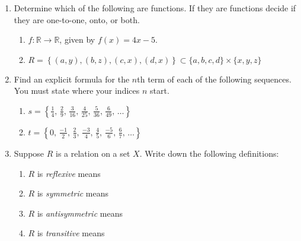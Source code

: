 \documentclass[12pt,letterpaper]{article}
\begin{document}
\begin{enumerate}

\newpage
\item Determine which of the following are functions.  If they are functions decide if they are one-to-one, onto, or both.  
\begin{enumerate}
\item $f:\mathbb R\to\mathbb R$, given by $f(x)=4x-5$.

\vspace{10pc}
\item $R=\left\{(a,y),(b,z),(c,x),(d,x)\right\}\subset\{a,b,c,d\}\times\{x,y,z\}$

\vspace{10pc}
\end{enumerate}

\item Find an explicit formula for the $n$th term of each of the following sequences.  You must state where your indices $n$ start.
\begin{enumerate}

\vspace{1pc}
\item $s=\left\{\frac{1}{4},\,\frac{2}{9},\,\frac{3}{16},\,\frac{4}{25},\,\frac{5}{36},\,\frac{6}{49},\,\dots\right\}$

\vspace{10pc}
\item $t=\left\{0,\,\frac{-1}{2},\,\frac{2}{3},\,\frac{-3}{4},\,\frac{4}{5},\,\frac{-5}{6},\,\frac{6}{7},\,\dots\right\}$
\end{enumerate}

\newpage
\item Suppose $R$ is a relation on a set $X$.  Write down the following definitions:
\begin{enumerate}

\vspace{1pc}
\item $R$ is \emph{reflexive} means

\vspace{5pc} 
\item $R$ is \emph{symmetric} means

\vspace{5pc} 
\item $R$ is \emph{antisymmetric} means

\vspace{5pc}
\item $R$ is \emph{transitive} means


\end{enumerate}
\end{enumerate}
\end{document}
